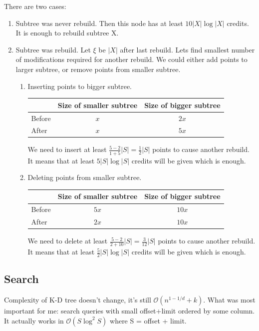 \documentclass[10pt,a4paper]{article}
\newcommand{\Oh}{\mathcal{O}}
\begin{document}
There are two cases:
\begin{enumerate}
\item Subtree was never rebuild. Then this node has at least $10 |X| \log |X|$ credits. It is enough to rebuild subtree X.
\item Subtree was rebuild. Let $\xi$ be $|X|$ after last rebuild. Lets find smallest number of modifications required for another rebuild. We could either add points to larger subtree, or remove points from smaller subtree.
\begin{enumerate}
\item Inserting points to bigger subtree.

\begin{tabular}{|l|c|c|}
\hline  & Size of smaller subtree & Size of bigger subtree  \\
\hline Before & $x$ & $2x$ \\
\hline After & $x$ & $5x$ \\
\hline 
\end{tabular}

We need to insert at least $ \frac{5 - 2}{1 + 5} |S| = \frac{1}{2} |S|$ points to cause another rebuild. It means that at least $5 |S| \log |S|$ credits will be given which is enough. 

\bigskip
\item Deleting points from smaller subtree.

\begin{tabular}{|l|c|c|}
\hline  & Size of smaller subtree & Size of bigger subtree  \\
\hline Before & $5x$ & $10x$ \\
\hline After & $2x$ & $10x$ \\
\hline 
\end{tabular}

We need to delete at least $\frac{5 - 2}{2 + 10} |S| = \frac{3}{12} |S|$ points to cause another rebuild. It means that at least $\frac{5}{2} |S| \log |S|$ credits will be given which is enough. 

\end{enumerate}
\end{enumerate}

\subsection{Search}
Complexity of K-D tree doesn't change, it's still $\Oh(n^{1-1/d} + k)$. What was most important for me: search queries with small offset+limit ordered by some column. It actually works in $\Oh(S \log^2 S)$ where S = offset + limit. 
\end{document}

